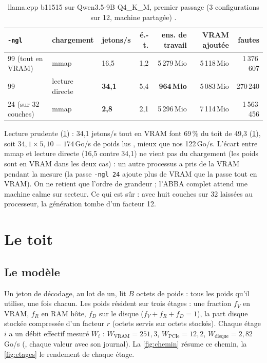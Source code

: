\begin{table}[ht]
\centering\small
\caption[llama.cpp sur Qwen3.5-9B Q4\_K\_M, premier passage]{llama.cpp b11515 sur Qwen3.5-9B Q4\_K\_M, premier passage (3 configurations sur 12, machine partagée) \mes.}
\label{tab:llama-base}
\begin{tabular}{@{}lllrrrr@{}}
\toprule
\texttt{-ngl} & chargement & jetons/s & é.-t. & ens. de travail & VRAM ajoutée & fautes \\
\midrule
99 (tout en VRAM) & mmap & 16,5 & 1,2 & 5\,279\,Mio & 5\,118\,Mio & 1\,376\,607 \\
99 & lecture directe & \textbf{34,1} & 5,4 & \textbf{964\,Mio} & 5\,083\,Mio & 270\,240 \\
24 (sur 32 couches) & mmap & \textbf{2,8} & 2,1 & 5\,296\,Mio & 7\,114\,Mio & 1\,563\,456 \\
\bottomrule
\end{tabular}
\end{table}

Lecture prudente (\cref{tab:llama-base}) : 34,1 jetons/s tout en VRAM font 69\,\% du toit de 49,3 (\cref{sec:toit}), soit $34{,}1 \times 5{,}10 = 174$\,Go/s de poids lus \calc, mieux que nos 122\,Go/s. L'écart entre mmap et lecture directe (16,5 contre 34,1) ne vient pas du chargement (les poids sont en VRAM dans les deux cas) : un autre processus a pris de la VRAM pendant la mesure (la passe \texttt{-ngl 24} ajoute plus de VRAM que la passe tout en VRAM). On ne retient que l'ordre de grandeur ; l'ABBA complet attend une machine calme sur secteur. Ce qui est sûr : avec huit couches sur 32 laissées au processeur, la génération tombe d'un facteur 12.

\section{Le toit}\label{sec:toit}

\subsection{Le modèle}

Un jeton de décodage, au lot de un, lit $B$ octets de poids : tous les poids qu'il utilise, une fois chacun. Les poids résident sur trois étages : une fraction $f_V$ en VRAM, $f_R$ en RAM hôte, $f_D$ sur le disque ($f_V + f_R + f_D = 1$), la part disque stockée compressée d'un facteur $r$ (octets servis sur octets stockés). Chaque étage $i$ a un débit effectif mesuré $W_i$ : $W_{\mathrm{VRAM}} = 251{,}3$, $W_{\mathrm{PCIe}} = 12{,}2$, $W_{\mathrm{disque}} = 2{,}82$\,Go/s (, chaque valeur avec son journal). La \cref{fig:chemin} résume ce chemin, la \cref{fig:etages} le rendement de chaque étage.

